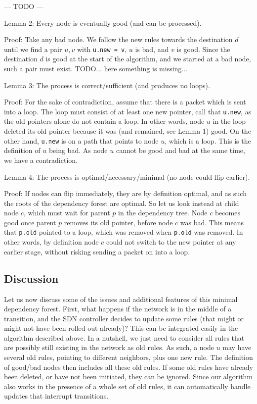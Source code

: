 --- TODO ---

Lemma 2: Every node is eventually good (and can be processed).

Proof: Take any bad node. We follow the new rules towards the destination $d$ until we find a pair $u,v$ with \texttt{u.new = v}, $u$ is bad, and $v$ is good. Since the destination $d$ is good at the start of the algorithm, and we started at a bad node, such a pair must exist. TODO... here something is missing...

Lemma 3: The process is correct/sufficient (and produces no loops).

Proof: For the sake of contradiction, assume that there is a packet which is sent into a loop. The loop must consist of at least one new pointer, call that \texttt{u.new}, as the old pointers alone do not contain a loop. In other words, node $u$ in the loop deleted its old pointer because it was (and remained, see Lemma 1) good. On the other hand, \texttt{u.new} is on a path that points to node $u$, which is a loop. This is the definition of $u$ being bad. As node $u$ cannot be good and bad at the same time, we have a contradiction.

Lemma 4: The process is optimal/necessary/minimal (no node could flip earlier).

Proof: If nodes can flip immediately, they are by definition optimal, and as such the roots of the dependency forest are optimal. So let us look instead at child node $c$, which must wait for parent $p$ in the dependency tree. Node $c$ becomes good once parent $p$ removes its old pointer, before node $c$ was bad. This means that \texttt{p.old} pointed to a loop, which was removed when \texttt{p.old} was removed. In other words, by definition node $c$ could not switch to the new pointer at any earlier stage, without risking sending a packet on into a loop.

\subsection{Discussion} %

Let us now discuss some of the issues and additional features of this minimal dependency forest. First, what happens if the network is in the middle of a transition, and the SDN controller decides to update some rules (that might or might not have been rolled out already)? This can be integrated easily in the algorithm described above. In a nutshell, we just need to consider all rules that are possibly still existing in the network as old rules. As such, a node $u$ may have several old rules, pointing to different neighbors, plus one new rule. The definition of good/bad nodes then includes all these old rules. If some old rules have already been deleted, or have not been initiated, they can be ignored. Since our algorithm also works in the presence of a whole set of old rules, it can automatically handle updates that interrupt transitions.

